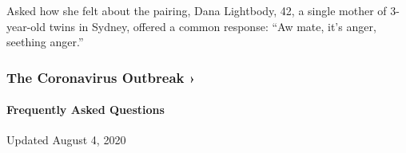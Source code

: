 Asked how she felt about the pairing, Dana Lightbody, 42, a single
mother of 3-year-old twins in Sydney, offered a common response: ``Aw
mate, it's anger, seething anger.''

\href{https://www.nytimes.com/news-event/coronavirus?action=click\&pgtype=Article\&state=default\&region=MAIN_CONTENT_3\&context=storylines_faq}{}

\hypertarget{the-coronavirus-outbreak-}{%
\subsubsection{The Coronavirus Outbreak
›}\label{the-coronavirus-outbreak-}}

\hypertarget{frequently-asked-questions}{%
\paragraph{Frequently Asked
Questions}\label{frequently-asked-questions}}

Updated August 4, 2020

